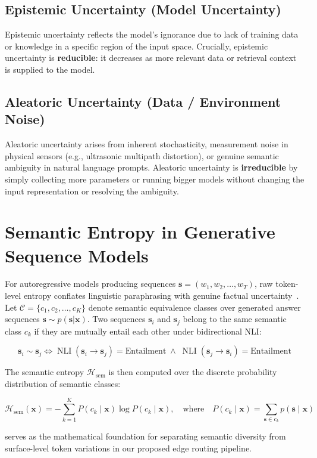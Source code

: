 \subsection{Epistemic Uncertainty (Model Uncertainty)}
Epistemic uncertainty reflects the model's ignorance due to lack of training data or knowledge in a specific region of the input space. Crucially, epistemic uncertainty is \textbf{reducible}: it decreases as more relevant data or retrieval context is supplied to the model.

\subsection{Aleatoric Uncertainty (Data / Environment Noise)}
Aleatoric uncertainty arises from inherent stochasticity, measurement noise in physical sensors (e.g., ultrasonic multipath distortion), or genuine semantic ambiguity in natural language prompts. Aleatoric uncertainty is \textbf{irreducible} by simply collecting more parameters or running bigger models without changing the input representation or resolving the ambiguity.

\section{Semantic Entropy in Generative Sequence Models}
\label{sec:bg_semantic_entropy}

For autoregressive models producing sequences $\mathbf{s} = (w_1, w_2, \dots, w_T)$, raw token-level entropy conflates linguistic paraphrasing with genuine factual uncertainty~\cite{kuhn2023semantic}. Let $\mathcal{C} = \{c_1, c_2, \dots, c_K\}$ denote semantic equivalence classes over generated answer sequences $\mathbf{s} \sim p(\mathbf{s}|\mathbf{x})$. Two sequences $\mathbf{s}_i$ and $\mathbf{s}_j$ belong to the same semantic class $c_k$ if they are mutually entail each other under bidirectional \ac{NLI}:

\begin{equation}
    \mathbf{s}_i \sim \mathbf{s}_j \iff \operatorname{NLI}(\mathbf{s}_i \to \mathbf{s}_j) = \text{Entailment} \;\land\; \operatorname{NLI}(\mathbf{s}_j \to \mathbf{s}_i) = \text{Entailment}
    \label{eq:semantic_equivalence}
\end{equation}

The semantic entropy $\mathcal{H}_{\text{sem}}$ is then computed over the discrete probability distribution of semantic classes:

\begin{equation}
    \mathcal{H}_{\text{sem}}(\mathbf{x}) = -\sum_{k=1}^{K} P(c_k \mid \mathbf{x}) \log P(c_k \mid \mathbf{x}), \quad \text{where} \quad P(c_k \mid \mathbf{x}) = \sum_{\mathbf{s} \in c_k} p(\mathbf{s} \mid \mathbf{x})
    \label{eq:semantic_entropy}
\end{equation}

 serves as the mathematical foundation for separating semantic diversity from surface-level token variations in our proposed edge routing pipeline.

